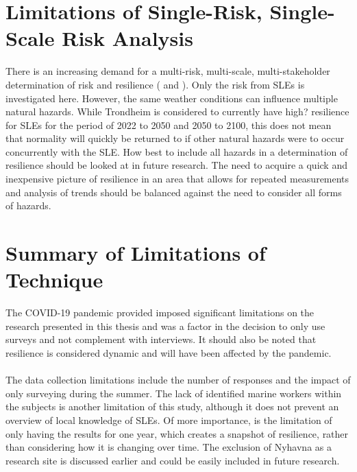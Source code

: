 \section{Limitations of Single-Risk, Single-Scale Risk Analysis} \label{discussion-limitation-single-risk}
There is an increasing demand for a multi-risk, multi-scale, multi-stakeholder determination of risk and resilience (\cite{gerkensmeier_governing_2018} and \cite{cutter_community_2020}).  Only the risk from SLEs is investigated here. However, the same weather conditions can influence multiple natural hazards. While Trondheim is considered to currently have high? resilience for SLEs for the period of 2022 to 2050 and 2050 to 2100, this does not mean that normality will quickly be returned to if  other natural hazards were to occur concurrently with the SLE. How best to include all hazards in a determination of resilience should be looked at in future research. The need to acquire a quick and inexpensive picture of resilience in an area that allows for repeated measurements and analysis of trends should be balanced against the need to consider all forms of hazards. 
\paragraph{}


\section{Summary of Limitations of Technique}
The COVID-19 pandemic provided imposed significant limitations on the research presented in this thesis and was a factor in the decision to only use surveys and not complement with interviews. It should also be noted that resilience is considered dynamic and will have been affected by the pandemic. 
\paragraph{}
The data collection limitations include the number of responses and the impact of only surveying during the summer. The lack of identified marine workers within the subjects is another limitation of this study, although it does not prevent an overview of local knowledge of SLEs. Of more importance, is the limitation of only having the results for one year, which creates a snapshot of resilience, rather than considering how it is changing over time. The exclusion of Nyhavna as a research site is discussed earlier and could be easily included in future research. 


